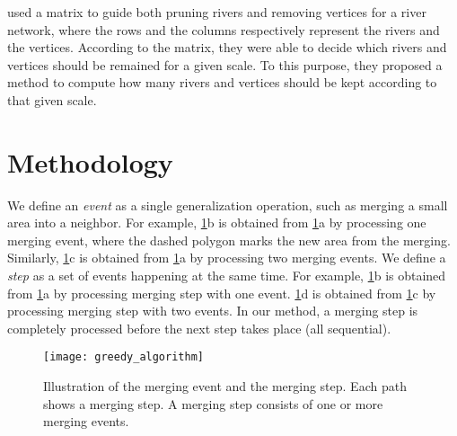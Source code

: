 \documentclass[ijgi,article,submit,moreauthors,pdftex]{Definitions/mdpi}
\begin{document}
\citet{Huang2017Matrix} used a matrix to guide 
both pruning rivers and removing vertices for a river network, 
where the rows and the columns respectively represent
the rivers and the vertices.
According to the matrix, 
they were able to decide which rivers and vertices 
should be remained for a given scale.
To this purpose, they proposed a method 
to compute how many rivers and vertices 
should be kept according to that given scale.







%

\section{Methodology}
\label{sec:methodology}




We define an \emph{event} as a single generalization operation, 
such as merging a small area into a neighbor.
For example, \fig\ref{fig:event_and_step}b is obtained from 
\fig\ref{fig:event_and_step}a by processing one merging event,
where the dashed polygon marks the new area from the merging.
Similarly, \fig\ref{fig:event_and_step}c is obtained from 
\fig\ref{fig:event_and_step}a by processing two merging events.
We define a \emph{step} as 
a set of events happening at the same time.
For example, 
\fig\ref{fig:event_and_step}b is obtained from 
\fig\ref{fig:event_and_step}a by processing merging step with one event.
\fig\ref{fig:event_and_step}d is obtained from 
\fig\ref{fig:event_and_step}c by processing merging step with two events.
In our method, a merging step is completely processed 
before the next step takes place (all sequential). 

\begin{figure}[tb]
\centering
\texttt{[image: greedy\_algorithm]}
\caption{Illustration of the merging event and the merging step. 
Each path shows a merging step. 
A merging step consists of one or more merging events.}
\label{fig:event_and_step}
\end{figure}
\end{document}
